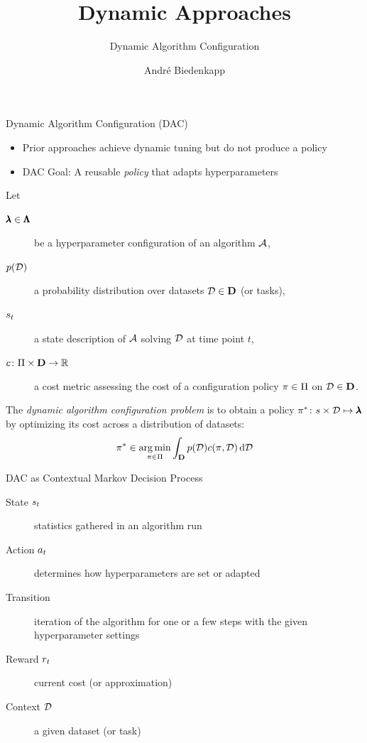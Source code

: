 \documentclass[main]{subfiles}
\title[Dynamic Approaches]{Dynamic Approaches}
\subtitle{Dynamic Algorithm Configuration}
\author[André Biedenkapp]{André Biedenkapp}
\date{}
\begin{document}
	
	\maketitle
\begin{frame}{Dynamic Algorithm Configuration (DAC)}
    \begin{itemize}
        \item Prior approaches achieve dynamic tuning but do not produce a policy\pause
        \item DAC Goal: A \alert{reusable \textit{policy}} that adapts hyperparameters\pause
    \end{itemize}
    Let
    \begin{description}
        \item[$\pmb{\lambda}\in\pmb{\Lambda}$] be a hyperparameter configuration of an algorithm $\mathcal{A}$,\pause
        \item[$p(\mathcal{D})$] a probability distribution over datasets $\mathcal{D}\in\mathbf{D}$ (or tasks),\pause
        \item[$s_t$] a state description of $\mathcal{A}$ solving $\mathcal{D}$ at time point $t$,\pause
        \item[$c\colon\Pi\times\mathbf{D}\to\mathbb{R}$] a cost metric assessing the cost of a configuration policy $\pi\in\Pi$ on $\mathcal{D}\in\mathbf{D}$.
    \end{description}\pause
    The \emph{dynamic algorithm configuration problem} is to obtain a policy $\pi^*\colon s\times\mathcal{D}\mapsto\pmb{\lambda}$ by optimizing its cost across a distribution of datasets:
    $$\pi^*\in\operatorname*{arg\,min}_{\pi\in\Pi}\int_{\mathbf{D}}p(\mathcal{D})c(\pi,\mathcal{D})\,\mathrm{d}\mathcal{D}$$
\end{frame}
\begin{frame}{DAC as Contextual Markov Decision Process\\ }
    \begin{description}
        \item[State $s_t$] statistics gathered in an algorithm run\pause
        \item[Action $a_t$] determines how hyperparameters are set or adapted\pause
        \item[Transition] iteration of the algorithm for one or a few steps with the given hyperparameter settings\pause
        \item[Reward $r_t$] current cost (or approximation)\pause
        \item[Context $\mathcal{D}$] a given dataset (or task)
    \end{description}
\end{frame}
\end{document}

